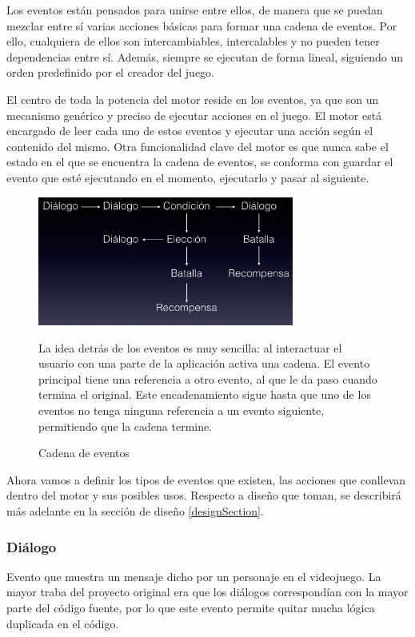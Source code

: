 Los eventos están pensados para unirse entre ellos, de manera que se puedan mezclar entre sí varias acciones básicas para formar una cadena de eventos. Por ello, cualquiera de ellos son intercambiables, intercalables y no pueden tener dependencias entre sí.
Además, siempre se ejecutan de forma lineal, siguiendo un orden predefinido por el creador del juego.

El centro de toda la potencia del motor reside en los eventos, ya que son un mecanismo genérico y preciso de ejecutar acciones en el juego. El motor está encargado de leer cada uno de estos eventos y ejecutar una acción según el contenido del mismo.
Otra funcionalidad clave del motor es que nunca sabe el estado en el que se encuentra la cadena de eventos, se conforma con guardar el evento que esté ejecutando en el momento, ejecutarlo y pasar al siguiente.

\begin{figure}[h]
	\caption{Cadena de eventos}
	\centering
	\includegraphics[width=0.75\textwidth]{include/eventsChainExample.jpg}
	
	La idea detrás de los eventos es muy sencilla: al interactuar el usuario con una parte de la aplicación activa una cadena. El evento principal tiene una referencia a otro evento, al que le da paso cuando termina el original. Este encadenamiento sigue hasta que uno de los eventos no tenga ninguna referencia a un evento siguiente, permitiendo que la cadena termine.
\end{figure}

Ahora vamos a definir los tipos de eventos que existen, las acciones que conllevan dentro del motor y sus posibles usos. Respecto a diseño que toman, se describirá más adelante en la sección de diseño \ref{designSection}. 

\subsubsection{Diálogo}
Evento que muestra un mensaje dicho por un personaje en el videojuego. La mayor traba del proyecto original era que los diálogos correspondían con la mayor parte del código fuente, por lo que este evento permite quitar mucha lógica duplicada en el código.

